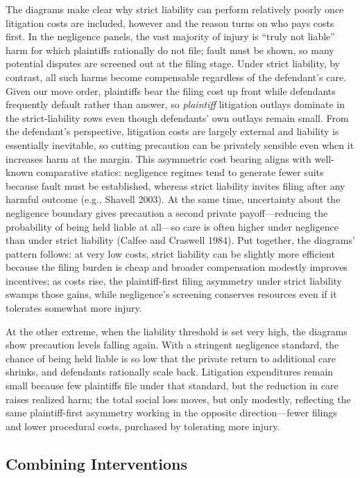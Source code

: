 \documentclass{article}
\begin{document}
The diagrams make clear why strict liability can perform relatively poorly once litigation costs are included, however and the reason turns on who pays costs first. In the negligence panels, the vast majority of injury is “truly not liable” harm for which plaintiffs rationally do not file; fault must be shown, so many potential disputes are screened out at the filing stage. Under strict liability, by contrast, all such harms become compensable regardless of the defendant’s care. Given our move order, plaintiffs bear the filing cost up front while defendants frequently default rather than answer, so \emph{plaintiff} litigation outlays dominate in the strict-liability rows even though defendants’ own outlays remain small. From the defendant’s perspective, litigation costs are largely external and liability is essentially inevitable, so cutting precaution can be privately sensible even when it increases harm at the margin. This asymmetric cost bearing aligns with well-known comparative statics: negligence regimes tend to generate fewer suits because fault must be established, whereas strict liability invites filing after any harmful outcome (e.g., Shavell 2003). At the same time, uncertainty about the negligence boundary gives precaution a second private payoff—reducing the probability of being held liable at all—so care is often higher under negligence than under strict liability (Calfee and Craswell 1984). Put together, the diagrams’ pattern follows: at very low costs, strict liability can be slightly more efficient because the filing burden is cheap and broader compensation modestly improves incentives; as costs rise, the plaintiff-first filing asymmetry under strict liability swamps those gains, while negligence’s screening conserves resources even if it tolerates somewhat more injury.

At the other extreme, when the liability threshold is set very high, the diagrams show precaution levels falling again. With a stringent negligence standard, the chance of being held liable is so low that the private return to additional care shrinks, and defendants rationally scale back. Litigation expenditures remain small because few plaintiffs file under that standard, but the reduction in care raises realized harm; the total social loss moves, but only modestly, reflecting the same plaintiff-first asymmetry working in the opposite direction—fewer filings and lower procedural costs, purchased by tolerating more injury.

\subsection{Combining Interventions}
\end{document}
